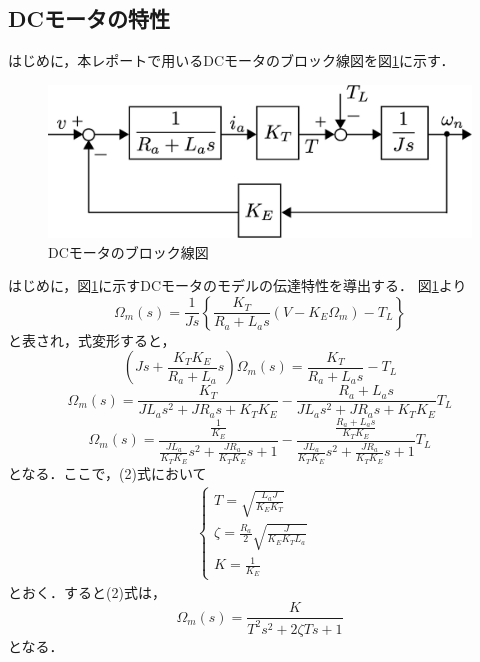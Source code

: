 \documentclass[a4paper,12pt]{jarticle}
\begin{document}
\subsection{DCモータの特性}
はじめに，本レポートで用いるDCモータのブロック線図を図\ref{fig:DC_model}に示す．
%
\begin{figure}[htbp]
 \begin{center}
  \includegraphics[width = 150mm]{fig/DC_model.eps}
 \end{center}
 \caption{DCモータのブロック線図}
 \label{fig:DC_model}
\end{figure}
%
はじめに，図\ref{fig:DC_model}に示すDCモータのモデルの伝達特性を導出する．
図\ref{fig:DC_model}より
%
\begin{equation}
 \Omega_m(s)=\frac{1}{Js}\left\{\frac{K_T}{R_{a}+L_{a}s}(V-K_E\Omega_m)-T_L\right\}
\end{equation}
と表され，式変形すると，
\begin{equation*}
 \left(Js+\frac{K_{T}K_{E}}{R_{a}+L_{a}}s\right)\Omega_m(s)=\frac{K_{T}}{R_{a}+L_{a}s}-T_L
\end{equation*}
%
\begin{equation*}
 \Omega_m(s)=\frac{K_T}{JL_{a}s^2+JR_{a}s+K_TK_E}-\frac{R_{a}+L_{a}s}{JL_{a}s^2+JR_{a}s+K_TK_E}T_L
\end{equation*}
%
\begin{equation}
 \Omega_m(s)=\frac{\frac{1}{K_E}}{\frac{JL_a}{K_{T}K_E}s^2+\frac{JR_a}{K_{T}K_E}s+1}-\frac{\frac{R_{a}+L_{a}s}{K_{T}K_E}}{\frac{JL_a}{K_{T}K_E}s^2+\frac{JR_a}{K_{T}K_E}s+1}T_L
\end{equation}
%
となる．ここで，(2)式において
\begin{eqnarray}
 \begin{cases}
  T = \sqrt{\frac{L_{a}J}{K_{E}K_T}} & \\
  \zeta= \frac{R_a}{2}\sqrt{\frac{J}{K_{E}K_{T}L_a}} & \\
  K = \frac{1}{K_E}
 \end{cases}
\end{eqnarray}
とおく．すると(2)式は，
\begin{equation}
 \Omega_m(s)=\frac{K}{T^2s^2+2\zeta Ts+1}
\end{equation}
となる．
\end{document}
